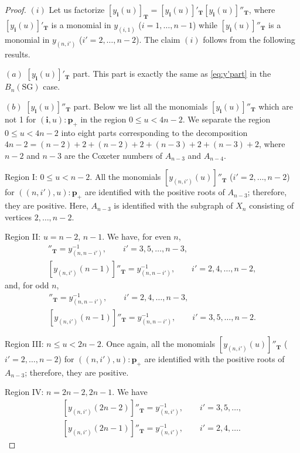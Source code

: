 \documentclass[pdftex]{sigma}
\numberwithin{equation}{section}
\theoremstyle{definition}
\begin{document}
\begin{proof}
$(i)$ Let us factorize $[y_{\mathbf{i}}(u)]_{\mathbf{T}}
=[y_{\mathbf{i}}(u)]'_{\mathbf{T}}
[y_{\mathbf{i}}(u)]''_{\mathbf{T}}$,
where
 $[y_{\mathbf{i}}(u)]'_{\mathbf{T}}$ is a monomial
in $y_{(i,1)}$ ($i=1,\dots,n-1$)
while
 $[y_{\mathbf{i}}(u)]''_{\mathbf{T}}$ is a monomial
in $y_{(n,i')}$ ($i'=2,\dots,n-2$).
The claim $(i)$ follows from the following results.

$(a)$ $[y_{\mathbf{i}}(u)]'_{\mathbf{T}}$ part.
This part is exactly the same as
\eqref{eq:y'part} in the $B_n(\mathrm{SG})$ case.


$(b)$  $[y_{\mathbf{i}}(u)]''_{\mathbf{T}}$ part.
Below we list all the monomials $[y_{\mathbf{i}}(u)]''_{\mathbf{T}}$
which are not 1 for $(\mathbf{i},u):\mathbf{p}_+$
in the region $0 \leq u < 4n-2$.
We separate the region $0 \leq u < 4n-2$ into eight parts
corresponding to the decomposition
$4n-2=(n-2)+2+(n-2)+2+(n-3)+2+(n-3)+2$,
where $n-2$ and $n-3$ are the Coxeter numbers
of $A_{n-3}$ and $A_{n-4}$.


Region I: $0\leq u < n-2$.
All the  monomials
$[y_{(n,i')}(u)]''_{\mathbf{T}}$ ($i'=2,\dots,n-2$)
 for $((n,i'),u):\mathbf{p}_+$
are identif\/ied with
the positive roots of $A_{n-3}$;
therefore, they are positive.
Here, $A_{n-3}$ is identif\/ied with  the subgraph of $X_n$
consisting of vertices $2, \dots, n-2$.


Region II: $u=n-2$, $n-1$.
We have, for even $n$,
\begin{gather*}
[y_{(n,i')}(n-2)]''_{\mathbf{T}} =y_{(n,n-i')}^{-1}, \qquad i'=3,5,\dots,n-3,\\
[y_{(n,i')}(n-1)]''_{\mathbf{T}} =y_{(n,n-i')}^{-1},\qquad  i'=2,4,\dots,n-2,
\end{gather*}
and, for odd $n$,
\begin{gather*}
[y_{(n,i')}(n-2)]''_{\mathbf{T}} =y_{(n,n-i')}^{-1}, \qquad i'=2,4,\dots,n-3,\\
[y_{(n,i')}(n-1)]''_{\mathbf{T}} =y_{(n,n-i')}^{-1},\qquad i'=3,5,\dots,n-2.
\end{gather*}

Region III: $n \leq u < 2n-2$.
Once again, all the  monomials
$[y_{(n,i')} (u)]''_{\mathbf{T}}$ ($i'=2,\dots,n-2$)
 for $((n,i'),u):\mathbf{p}_+$
are  identif\/ied with
the positive roots of $A_{n-3}$;
therefore, they are positive.

Region IV: $n=2n-2, 2n-1$. We have
\begin{gather*}
[y_{(n,i')}(2n-2)]''_{\mathbf{T}} =y_{(n,i')}^{-1}, \qquad i'=3,5,\dots,\\
[y_{(n,i')}(2n-1)]''_{\mathbf{T}} =y_{(n,i')}^{-1}, \qquad  i'=2,4,\dots.
\end{gather*}


\end{proof}
\end{document}
